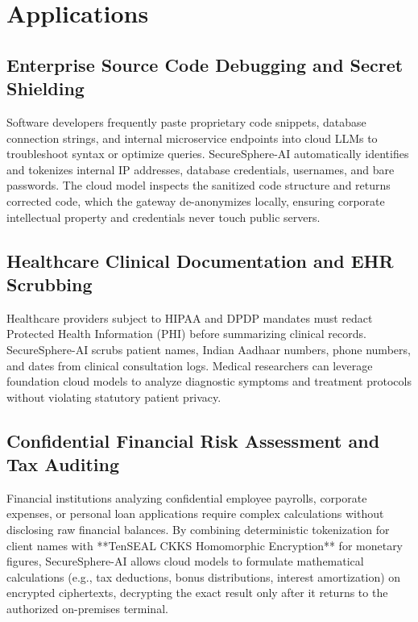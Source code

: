 \documentclass[12pt,a4paper,oneside]{report}
\numberwithin{equation}{chapter}
\begin{document}
\section{Applications}

\subsection{Enterprise Source Code Debugging and Secret Shielding}
Software developers frequently paste proprietary code snippets, database connection strings, and internal microservice endpoints into cloud LLMs to troubleshoot syntax or optimize queries. SecureSphere-AI automatically identifies and tokenizes internal IP addresses, database credentials, usernames, and bare passwords. The cloud model inspects the sanitized code structure and returns corrected code, which the gateway de-anonymizes locally, ensuring corporate intellectual property and credentials never touch public servers.

\subsection{Healthcare Clinical Documentation and EHR Scrubbing}
Healthcare providers subject to HIPAA and DPDP mandates must redact Protected Health Information (PHI) before summarizing clinical records. SecureSphere-AI scrubs patient names, Indian Aadhaar numbers, phone numbers, and dates from clinical consultation logs. Medical researchers can leverage foundation cloud models to analyze diagnostic symptoms and treatment protocols without violating statutory patient privacy.

\subsection{Confidential Financial Risk Assessment and Tax Auditing}
Financial institutions analyzing confidential employee payrolls, corporate expenses, or personal loan applications require complex calculations without disclosing raw financial balances. By combining deterministic tokenization for client names with **TenSEAL CKKS Homomorphic Encryption** for monetary figures, SecureSphere-AI allows cloud models to formulate mathematical calculations (e.g., tax deductions, bonus distributions, interest amortization) on encrypted ciphertexts, decrypting the exact result only after it returns to the authorized on-premises terminal.

\end{document}
